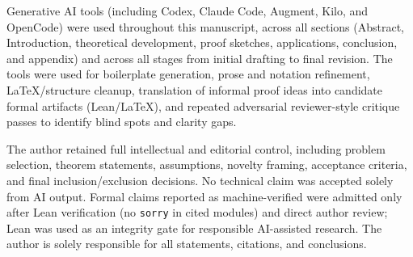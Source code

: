 Generative AI tools (including Codex, Claude Code, Augment, Kilo, and OpenCode) were used throughout this manuscript, across all sections (Abstract, Introduction, theoretical development, proof sketches, applications, conclusion, and appendix) and across all stages from initial drafting to final revision. The tools were used for boilerplate generation, prose and notation refinement, \LaTeX{}/structure cleanup, translation of informal proof ideas into candidate formal artifacts (Lean/\LaTeX{}), and repeated adversarial reviewer-style critique passes to identify blind spots and clarity gaps.

The author retained full intellectual and editorial control, including problem selection, theorem statements, assumptions, novelty framing, acceptance criteria, and final inclusion/exclusion decisions. No technical claim was accepted solely from AI output. Formal claims reported as machine-verified were admitted only after Lean verification (no \texttt{sorry} in cited modules) and direct author review; Lean was used as an integrity gate for responsible AI-assisted research. The author is solely responsible for all statements, citations, and conclusions.

\appendix
